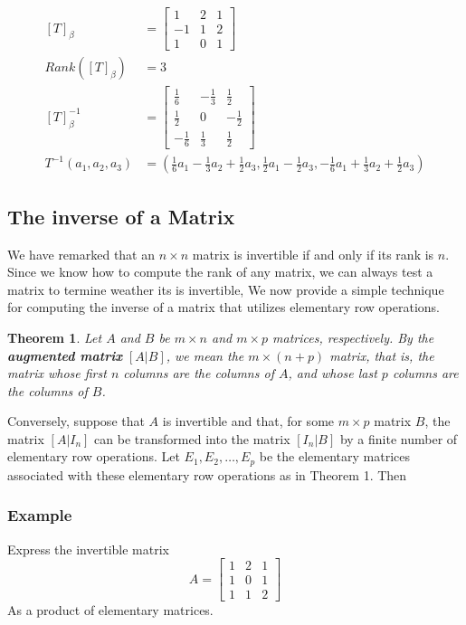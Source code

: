 \documentclass[10pt, oneside]{article}
\newtheorem{thm}{Theorem}
\begin{document}
\[
	\begin{split}
		[T]_{\beta} &= \begin{bmatrix} 1 & 2 & 1 \\ -1 & 1 & 2 \\ 1 & 0 & 1 \end{bmatrix} \\
		Rank([T]_{\beta}) &= 3 \\
		[T]_{\beta}^{-1} &= \begin{bmatrix} \frac{1}{6}  & -\frac{1}{3} & \frac{1}{2}  \\
                \frac{1}{2}  & 0            & -\frac{1}{2} \\
                -\frac{1}{6} & \frac{1}{3}  & \frac{1}{2}\end{bmatrix} \\
		T^{-1}(a_1, a_2, a_3) &= (\frac{1}{6}a_1 - \frac{1}{3}a_2 + \frac{1}{2}a_3, \frac{1}{2}a_1 - \frac{1}{2}a_3, -\frac{1}{6}a_1 + \frac{1}{3}a_2 + \frac{1}{2}a_3)
	\end{split}
\]

\subsection{The inverse of a Matrix}
We have remarked that an $n \times n$ matrix is invertible if and only if its rank is $n$. Since we know how to compute the rank of any matrix, we can always test a matrix
to termine weather its is invertible, We now provide a simple technique for computing the inverse of a matrix that utilizes elementary row operations.

\begin{thm}
	Let $A$ and $B$ be $m \times n$ and $m \times p$ matrices, respectively. By the \textbf{augmented matrix} $[A|B]$, we mean the $m \times (n + p)$ matrix, that is, the matrix whose first $n$ columns are
	the columns of $A$, and whose last $p$ columns are the columns of $B$.
\end{thm}

Conversely, suppose that $A$ is invertible and that, for some $m \times p$ matrix $B$, the matrix $[A|I_n]$ can be transformed into the matrix $[I_n|B]$ by a finite number of elementary row operations.
Let $E_1, E_2, \ldots, E_p$ be the elementary matrices associated with these elementary row operations as in Theorem 1. Then


\subsubsection{Example}
Express the invertible matrix
\[
	A = \begin{bmatrix} 1 & 2 & 1 \\ 1 & 0 & 1 \\ 1 & 1 & 2 \end{bmatrix}
\]
As a product of elementary matrices.
\end{document}
